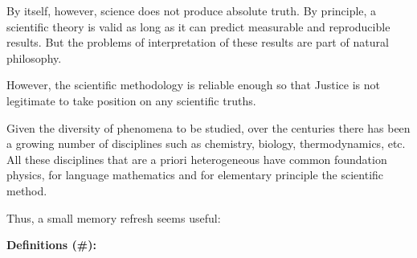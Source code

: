	\marginnote{\textcolor{NavyBlue}{{\footnotesize \textbf{~\thechapter:\myparagraph}}}}By itself, however, science does not produce absolute truth. By principle, a scientific theory is valid as long as it can predict measurable and reproducible results. But the problems of interpretation of these results are part of natural philosophy.
	
	\begin{center}
	\end{center}
	However, the scientific methodology is reliable enough so that Justice is not legitimate to take position on any scientific truths.

	Given the diversity of phenomena to be studied, over the centuries there has been a growing number of disciplines such as chemistry, biology, thermodynamics, etc. All these disciplines that are a priori heterogeneous have common foundation physics, for language mathematics and for elementary principle the scientific method.

	Thus, a small memory refresh seems useful:

\textbf{Definitions (\#\mydef):}

